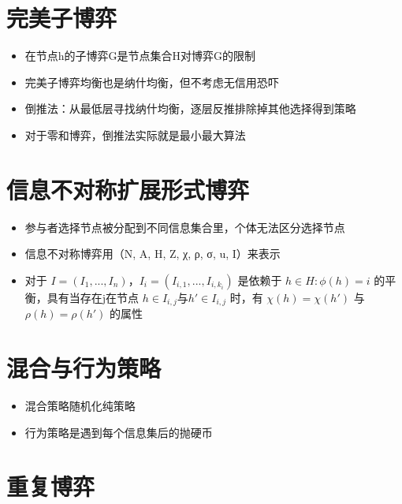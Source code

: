 \documentclass[
]{book}
\providecommand{\tightlist}{%
  \setlength{\itemsep}{0pt}\setlength{\parskip}{0pt}}
\begin{document}
\hypertarget{ux5b8cux7f8eux5b50ux535aux5f08}{%
\section{完美子博弈}\label{ux5b8cux7f8eux5b50ux535aux5f08}}

\begin{itemize}
\tightlist
\item
  在节点h的子博弈G是节点集合H对博弈G的限制
\item
  完美子博弈均衡也是纳什均衡，但不考虑无信用恐吓
\item
  倒推法：从最低层寻找纳什均衡，逐层反推排除掉其他选择得到策略
\item
  对于零和博弈，倒推法实际就是最小最大算法
\end{itemize}

\hypertarget{ux4fe1ux606fux4e0dux5bf9ux79f0ux6269ux5c55ux5f62ux5f0fux535aux5f08}{%
\section{信息不对称扩展形式博弈}\label{ux4fe1ux606fux4e0dux5bf9ux79f0ux6269ux5c55ux5f62ux5f0fux535aux5f08}}

\begin{itemize}
\tightlist
\item
  参与者选择节点被分配到不同信息集合里，个体无法区分选择节点
\item
  信息不对称博弈用（N, A, H, Z, χ, ρ, σ, u, I）来表示
\item
  对于 \(I = (I_1,...,I_n)\)，\(I_i = (I_{i,1},...,I_{i,k_i})\) 是依赖于 \({h\in H: \phi (h) = i}\) 的平衡，具有当存在j在节点 \(h\in I_{i,j}\)与\(h'\in I_{i,j}\) 时，有 \(\chi(h) = \chi(h')\) 与 \(\rho(h) = \rho(h')\) 的属性
\end{itemize}

\hypertarget{ux6df7ux5408ux4e0eux884cux4e3aux7b56ux7565}{%
\section{混合与行为策略}\label{ux6df7ux5408ux4e0eux884cux4e3aux7b56ux7565}}

\begin{itemize}
\tightlist
\item
  混合策略随机化纯策略
\item
  行为策略是遇到每个信息集后的抛硬币
\end{itemize}

\hypertarget{ux91cdux590dux535aux5f08}{%
\section{重复博弈}\label{ux91cdux590dux535aux5f08}}
\end{document}
